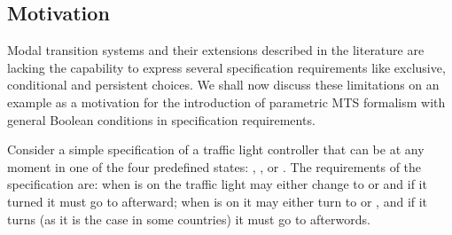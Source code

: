 \subsection{Motivation} 
Modal transition systems 
and their extensions described in the literature
are lacking the capability to express several 
specification requirements like exclusive, conditional and persistent choices.
We shall now discuss these limitations on an example
as a motivation for the introduction of parametric MTS formalism with
general Boolean conditions in specification requirements.

Consider a simple specification of a traffic light controller that can 
be at any moment in one of the four predefined states:
\red, \green, \yellow or \yellowRed.
The requirements of the specification are: when \green is on the traffic 
light may either change to \red or \yellow and if it turned \yellow it must 
go to \red afterward; when \red is on it may either turn to 
\green or \yellowRed, and if it turns \yellowRed (as it is the case in some
countries) it must go to \green afterwords. 


